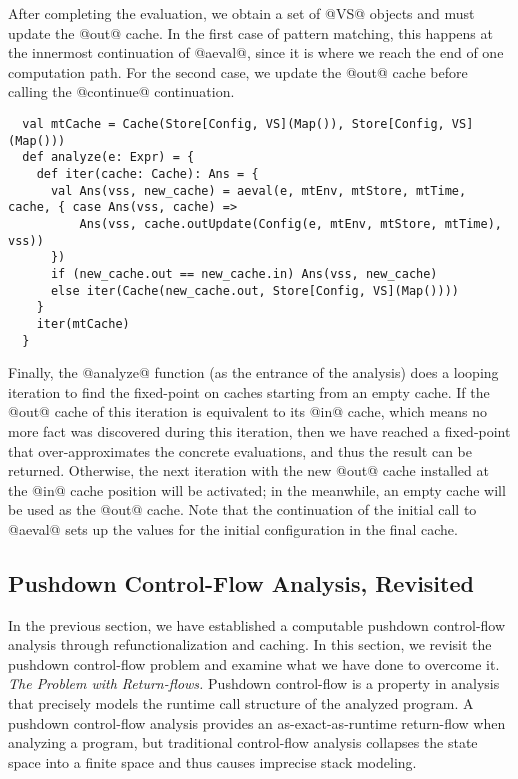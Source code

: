 \documentclass[acmsmall, review]{acmart}\settopmatter{}
\begin{document}
After completing the evaluation, we obtain a set of @VS@ objects and must update the @out@ cache.
In the first case of pattern matching, this happens at the innermost continuation of @aeval@,
since it is where we reach the end of one computation path.
For the second case, we update the @out@ cache before calling the @continue@ continuation.

\begin{lstlisting}
  val mtCache = Cache(Store[Config, VS](Map()), Store[Config, VS](Map()))
  def analyze(e: Expr) = {
    def iter(cache: Cache): Ans = {
      val Ans(vss, new_cache) = aeval(e, mtEnv, mtStore, mtTime, cache, { case Ans(vss, cache) => 
          Ans(vss, cache.outUpdate(Config(e, mtEnv, mtStore, mtTime), vss))
      })
      if (new_cache.out == new_cache.in) Ans(vss, new_cache)
      else iter(Cache(new_cache.out, Store[Config, VS](Map())))
    }
    iter(mtCache)
  }
\end{lstlisting}

Finally, the @analyze@ function (as the entrance of the analysis) does a looping iteration
to find the fixed-point on caches starting from an empty cache.
If the @out@ cache of this iteration is equivalent to its @in@ cache, which means no more 
fact was discovered during this iteration, then we have reached a fixed-point that 
over-approximates the concrete evaluations, and thus the result can be returned.
Otherwise, the next iteration with the new @out@ cache installed at the @in@ cache
position will be activated; in the meanwhile, an empty cache will be used as the @out@
cache. Note that the continuation of the initial call to @aeval@ sets up the values for
the initial configuration in the final cache.

\subsection{Pushdown Control-Flow Analysis, Revisited} \label{pdcfarevisit}

In the previous section, we have established a computable pushdown control-flow
analysis through refunctionalization and caching. In this section, we revisit 
the pushdown control-flow problem and examine what we have done to overcome it. \\

\textit{The Problem with Return-flows.}
Pushdown control-flow is a property in analysis that precisely models the runtime
call structure of the analyzed program. A pushdown control-flow analysis provides an 
as-exact-as-runtime return-flow when analyzing a program, but traditional 
control-flow analysis collapses the state space into a finite space and thus 
causes imprecise stack modeling.
\end{document}
